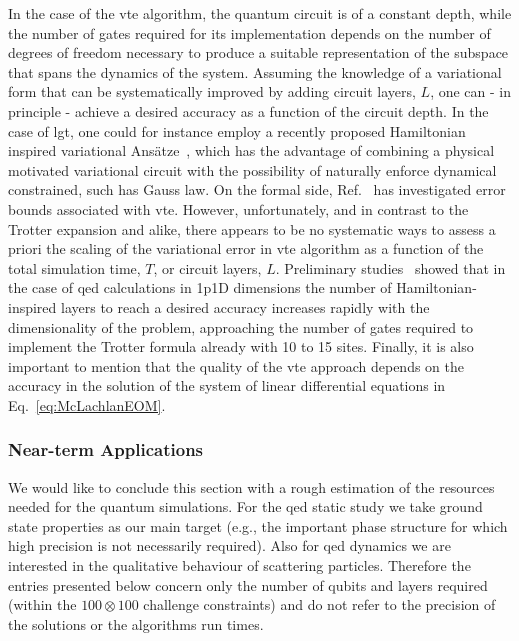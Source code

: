 In the case of the \gls{vte} algorithm, the quantum circuit is of a constant depth, while the number of gates required for its implementation depends on the number of degrees of freedom necessary to produce a suitable representation of the subspace that spans the dynamics of the system. Assuming the knowledge of a variational form that can be systematically improved by adding circuit layers, $L$, one can - in principle - achieve a desired accuracy as a function of the circuit depth. 
In the case of \gls{lgt}, one could for instance employ a recently proposed Hamiltonian inspired variational Ans\"atze~\cite{Mazzola2021}, which has the advantage of combining a physical motivated variational circuit with the possibility of naturally enforce dynamical constrained, such has Gauss law. On the formal side, Ref.~\cite{zoufal2021error} has investigated error bounds associated with \gls{vte}. However, unfortunately, and in contrast to the Trotter expansion and alike, there appears to be no systematic ways to assess a priori the scaling of the variational error in \gls{vte} algorithm as a function of the total simulation time, $T$, or circuit layers, $L$. 
Preliminary studies~\cite{thesisNicola} showed that in the case of \gls{qed} calculations in \gls{1p1D} dimensions the number of Hamiltonian-inspired layers to reach a desired accuracy increases rapidly with the dimensionality of the problem, approaching the number of gates required to implement the Trotter formula already with 10 to 15 sites. 
Finally, it is also important to mention that the quality of the \gls{vte} approach depends on the accuracy in the solution of the system of linear differential equations in Eq.~\eqref{eq:McLachlanEOM}. 

\subsubsection{Near-term Applications} 
We would like to conclude this section with a rough estimation of the resources needed for the quantum simulations. For the \gls{qed} static study we take ground state properties as our main target (e.g., the important phase structure for which high precision is not necessarily required). Also for \gls{qed} dynamics we are interested in the qualitative behaviour of scattering particles.    
Therefore the entries presented below concern only the number of qubits and layers required (within the $100 \otimes 100$ challenge constraints) and do not refer to the precision of the solutions or the algorithms run times.

